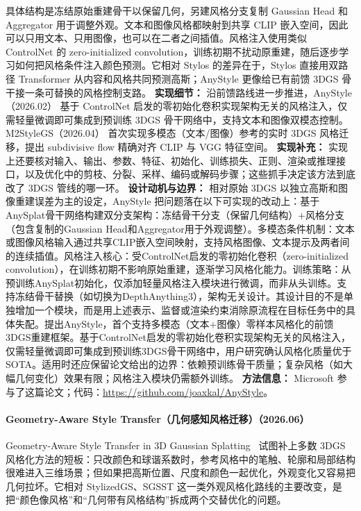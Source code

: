 具体结构是冻结原始重建骨干以保留几何，另建风格分支复制 Gaussian Head 和 Aggregator 用于调整外观。文本和图像风格都映射到共享 CLIP 嵌入空间，因此可以只用文本、只用图像，也可以在二者之间插值。风格注入使用类似 ControlNet 的 zero-initialized convolution，训练初期不扰动原重建，随后逐步学习如何把风格条件注入颜色预测。它相对 Stylos 的差异在于，Stylos 直接用双路径 Transformer 从内容和风格共同预测高斯；AnyStyle 更像给已有前馈 3DGS 骨干接一条可替换的风格控制支路。
\textbf{实现细节：} 沿前馈路线进一步推进，AnyStyle（2026.02） 基于 ControlNet 启发的零初始化卷积实现架构无关的风格注入，仅需轻量微调即可集成到预训练 3DGS 骨干网络中，支持文本和图像双模态控制。M2StyleGS（2026.04） 首次实现多模态（文本/图像）参考的实时 3DGS 风格迁移，提出 subdivisive flow 精确对齐 CLIP 与 VGG 特征空间。
\textbf{实现补充：} 实现上还要核对输入、输出、参数、特征、初始化、训练损失、正则、渲染或推理接口，以及优化中的剪枝、分裂、采样、编码或解码步骤；这些抓手决定该方法到底改了 3DGS 管线的哪一环。
\textbf{设计动机与边界：} 相对原始 3DGS 以独立高斯和图像重建误差为主的设定，AnyStyle 把问题落在以下可实现的改动上：基于AnySplat骨干网络构建双分支架构：冻结骨干分支（保留几何结构）+风格分支（包含复制的Gaussian Head和Aggregator用于外观调整）。多模态条件机制：文本或图像风格输入通过共享CLIP嵌入空间映射，支持风格图像、文本提示及两者间的连续插值。风格注入核心：受ControlNet启发的零初始化卷积（zero-initialized convolution），在训练初期不影响原始重建，逐渐学习风格化能力。训练策略：从预训练AnySplat初始化，仅添加轻量风格注入模块进行微调，而非从头训练。支持冻结骨干替换（如切换为DepthAnything3），架构无关设计。其设计目的不是单独增加一个模块，而是用上述表示、监督或渲染约束消除原流程在目标任务中的具体失配。提出AnyStyle，首个支持多模态（文本+图像）零样本风格化的前馈3DGS重建框架。基于ControlNet启发的零初始化卷积实现架构无关的风格注入，仅需轻量微调即可集成到预训练3DGS骨干网络中，用户研究确认风格化质量优于SOTA。适用时还应保留论文给出的边界：依赖预训练骨干质量；复杂风格（如大幅几何变化）效果有限；风格注入模块仍需额外训练。
\textbf{方法信息：} Microsoft 参与了这篇论文；代码：\url{https://github.com/joaxkal/AnyStyle}。



\paragraph{Geometry-Aware Style Transfer（几何感知风格迁移）（2026.06）}
Geometry-Aware Style Transfer in 3D Gaussian Splatting~\cite{2606_24144} 试图补上多数 3DGS 风格化方法的短板：只改颜色和球谐系数时，参考风格中的笔触、轮廓和局部结构很难进入三维场景；但如果把高斯位置、尺度和颜色一起优化，外观变化又容易把几何拉坏。它相对 StylizedGS、SGSST 这一类外观风格化路线的主要改变，是把“颜色像风格”和“几何带有风格结构”拆成两个交替优化的问题。

